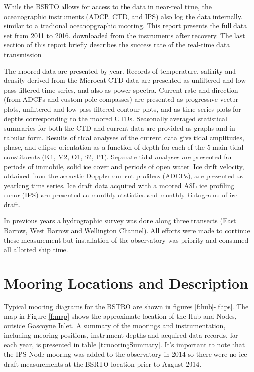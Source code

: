 \documentclass[12pt]{dforeport}
\begin{document}
While the BSRTO allows for access to the data in near-real time, the oceanographic instruments (ADCP, CTD, and IPS) also log the data internally, similar to a tradional oceanopgraphic mooring. This report presents the full data set from 2011 to 2016, downloaded from the instruments after recovery. The last section of this report briefly describes the success rate of the real-time data transmission.

The moored data are presented by year.  Records of temperature, salinity and density derived from the Microcat CTD data are presented as unfiltered and low-pass filtered time series, and also as power spectra. Current rate and direction (from ADCPs and custom pole compasses) are presented as progressive vector plots, unfiltered and low-pass filtered contour plots, and as time series plots for depths corresponding to the moored CTDs.   Seasonally averaged statistical summaries for both the CTD and current data are provided as graphs and in tabular form.  Results of tidal analyses of the current data give tidal amplitudes, phase, and ellipse orientation as a function of depth for each of the 5 main tidal constituents (K1, M2, O1, S2, P1).  Separate tidal analyses are presented for periods of immobile, solid ice cover and periods of open water. Ice drift velocity, obtained from the acoustic Doppler current profilers (ADCPs), are presented as yearlong time series.  Ice draft data acquired with a moored ASL ice profiling sonar (IPS) are presented as monthly statistics and monthly histograms of ice draft.

In previous years a hydrographic survey was done along three transects (East Barrow, West Barrow and Wellington Channel). All efforts were made to continue these measurement but installation of the observatory was priority and consumed all allotted ship time.

\section{Mooring Locations and Description}

Typical mooring diagrams for the BSTRO are shown in figures \ref{f:hub}-\ref{f:ips}.  The map in Figure \ref{f:map} shows the approximate location of the Hub and Nodes, outside Gascoyne Inlet.  A summary of the moorings and instrumentation, including mooring positions, instrument depths and acquired data records, for each year, is presented in table \ref{t:mooringSummary}. It's important to note that the IPS Node mooring was added to the observatory in 2014 so there were no ice draft measurements at the BSRTO location prior to August 2014.
  
\end{document}
